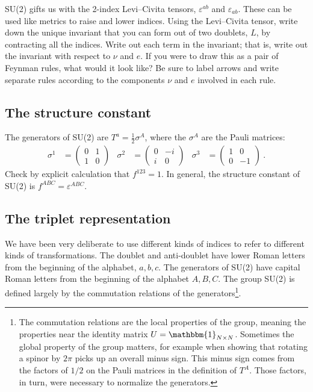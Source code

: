 \documentclass[12pt]{article}
\numberwithin{equation}{section}    %
\begin{document}
SU(2) gifts us with the 2-index Levi--Civita tensors, $\varepsilon^{ab}$ and $\varepsilon_{ab}$. These can be used like metrics to raise and lower indices. Using the Levi--Civita tensor, write down the unique invariant that you can form out of two doublets, $L$, by contracting all the indices. Write out each term in the invariant; that is, write out the invariant with respect to $\nu$ and $e$. If you were to draw this as a pair of Feynman rules, what would it look like? Be sure to label arrows and write separate rules according to the components $\nu$ and $e$ involved in each rule.

\subsection{The structure constant}

The generators of SU(2) are $T^a = \frac{1}{2}\sigma^A$, where the $\sigma^A$ are the Pauli matrices:
\begin{align}
	\sigma^1 &= 
	\begin{pmatrix}
		0 & 1\\
		1 &0
	\end{pmatrix}
	&
	\sigma^2 &= 
	\begin{pmatrix}
		0 & -i\\
		i &0
	\end{pmatrix}
	&
	\sigma^3 &= 
	\begin{pmatrix}
		1 & 0\\
		0 & -1
	\end{pmatrix} \ .
\end{align}
Check by explicit calculation that $f^{123} = 1$. In general, the structure constant of SU(2) is $f^{ABC} = \varepsilon^{ABC}$. 

\subsection{The triplet representation}

We have been very deliberate to use different kinds of indices to refer to different kinds of transformations. The doublet and anti-doublet have lower Roman letters from the beginning of the alphabet, $a,b,c$. The generators of SU(2) have capital Roman letters from the beginning of the alphabet $A,B,C$. The group SU(2) is defined largely by the commutation relations of the generators\footnote{The commutation relations are the local properties of the group, meaning the properties near the identity matrix $U=\mathbbm{1}_{N\times N}$. Sometimes the global property of the group matters, for example when showing that rotating a spinor by $2\pi$ picks up an overall minus sign. This minus sign comes from the factors of $1/2$ on the Pauli matrices in the definition of $T^A$. Those factors, in turn, were necessary to normalize the generators.}. 
\end{document}
